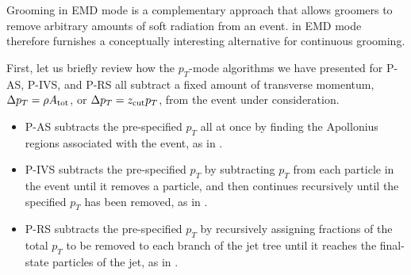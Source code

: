 Grooming in EMD mode is a complementary approach that allows \PIRANHA{} groomers to remove arbitrary amounts of soft radiation from an event.
%
\PIRANHA{} in EMD mode therefore furnishes a conceptually interesting alternative for continuous grooming.

First, let us briefly review how the \(p_T\)-mode algorithms we have presented for P-AS, P-IVS, and P-RS all subtract a fixed amount of transverse momentum, \(\Delta p_T = \rho A_{\rm tot}\), or \(\Delta p_T = z_{\rm cut} p_T\), from the event under consideration.
%
\begin{itemize}
\item
P-AS subtracts the pre-specified \(p_T\) all at once by finding the Apollonius regions associated with the event, as in .
%
\item
P-IVS subtracts the pre-specified \(p_T\) by subtracting \(p_T\) from each particle in the event until it removes a particle, and then continues recursively until the specified \(p_T\) has been removed, as in .
%
\item
P-RS subtracts the pre-specified \(p_T\) by recursively assigning fractions of the total \(p_T\) to be removed to each branch of the jet tree until it reaches the final-state particles of the jet, as in .
\end{itemize}


